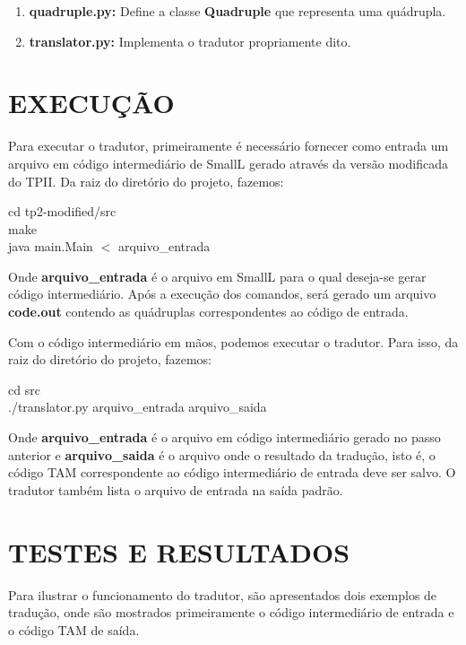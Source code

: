 \documentclass[12pt]{article}
\begin{document}
\begin{enumerate}
 \item \textbf{quadruple.py:} Define a classe \textbf{Quadruple} que representa uma quádrupla.
 
 \item \textbf{translator.py:} Implementa o tradutor propriamente dito.
\end{enumerate}

\section{EXECUÇÃO}

Para executar o tradutor, primeiramente é necessário fornecer como entrada um arquivo em código intermediário de SmallL
gerado através da versão modificada do TPII. Da raiz do diretório do projeto, fazemos:

\begin{center}
  cd tp2-modified/src \\
  make \\
  java main.Main $<$ arquivo\_entrada
\end{center}

Onde \textbf{arquivo\_entrada} é o arquivo em SmallL para o qual deseja-se gerar código intermediário. Após a execução dos 
comandos, será gerado um arquivo \textbf{code.out} contendo as quádruplas correspondentes ao código de entrada.

Com o código intermediário em mãos, podemos executar o tradutor. Para isso, da raiz do diretório do projeto, fazemos:

\begin{center}
 cd src \\
 ./translator.py arquivo\_entrada arquivo\_saida
\end{center}

Onde \textbf{arquivo\_entrada} é o arquivo em código intermediário gerado no passo anterior e \textbf{arquivo\_saida}
é o arquivo onde o resultado da tradução, isto é, o código TAM correspondente ao código intermediário de entrada
deve ser salvo. O tradutor também lista o arquivo de entrada na saída padrão.

\section{TESTES E RESULTADOS}

Para ilustrar o funcionamento do tradutor, são apresentados dois exemplos de tradução, onde são mostrados primeiramente
o código intermediário de entrada e o código TAM de saída.
\end{document}
